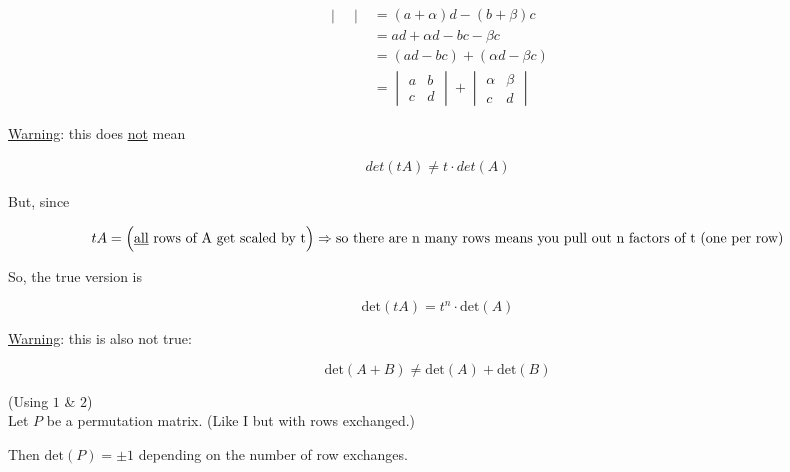 \documentclass[twocolumn,draft]{article}
\begin{document}
\begin{enumerate}
\begin{enumerate}
\begin{align*}
\begin{vmatrix}
					\end{vmatrix}
					&= (a+\alpha)d - (b+\beta)c  \\
					&= ad + \alpha d - bc - \beta c \\
					&= (ad - bc) + (\alpha d - \beta c) \\
					&=
					\begin{vmatrix}
						a & b \\ c & d
					\end{vmatrix} +
					\begin{vmatrix}
						\alpha & \beta \\ c & d
					\end{vmatrix} \tag*{(addition)}
				\end{align*}
		\end{enumerate}
  \end{enumerate}
  
  \underline{Warning}: this does \underline{not} mean
  
  \begin{align*}
  	det(tA) \neq t\cdot det(A)
  \end{align*}
  
  But, since
  
  \begin{equation*}
  	tA = \Big(\text{\underline{all} rows of A get scaled by t}\Big)
		 \Rightarrow \text{so there are n many rows means you pull out n factors of t
		 (one per row)}
  \end{equation*}
  
  So, the true version is
  
  \begin{equation*}
  	\text{det}(tA) = t^{n}\cdot\text{det}(A)
  \end{equation*}
  
  \underline{Warning}: this is also not true:
  
  \begin{equation*}
	  \text{det}(A+B) \neq \text{det}(A) + \text{det}(B)
  \end{equation*}
  
  \noindent (Using $1$ \& $2$) \\
  
  Let $P$ be a permutation matrix. (Like I but with rows exchanged.)
  
  Then $\text{det}(P) = \pm 1$ depending on the number of row exchanges.
  
\end{document}
